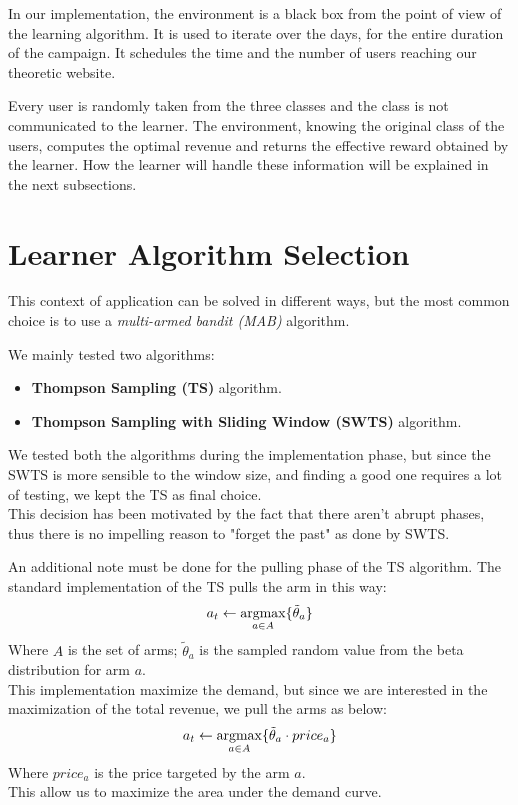 In our implementation, the environment is a black box from the point of view of the learning algorithm.
It is used to iterate over the days, for the entire duration of the campaign.
It schedules the time and the number of users reaching our theoretic website.

Every user is randomly taken from the three classes and the class is not communicated to the learner. The environment, knowing the original class of the users, computes the optimal revenue and returns the effective reward obtained by the learner.
How the learner will handle these information will be explained in the next subsections.

\section{Learner Algorithm Selection}

This context of application can be solved in different ways, but the most common choice is to use a \textit{multi-armed bandit (MAB)} algorithm.

We mainly tested two algorithms:
\begin{itemize}
	\item \textbf{Thompson Sampling (TS)} algorithm.
	\item \textbf{Thompson Sampling with Sliding Window (SWTS)} algorithm.
\end{itemize}

We tested both the algorithms during the implementation phase, but since the SWTS is more sensible to the window size, and finding a good one requires a lot of testing, we kept the TS as final choice.\\
This decision has been motivated by the fact that there aren't abrupt phases, thus there is no impelling reason to "forget the past" as done by SWTS.

An additional note must be done for the pulling phase of the TS algorithm. The standard implementation of the TS pulls the arm in this way:
\begin{equation}
a_t \leftarrow \operatorname*{argmax}_{a \in A} \{\tilde{\theta}_a\}
\end{equation}
Where $A$ is the set of arms; $\tilde{\theta}_a$  is the sampled random value from the beta distribution for arm $a$.\\
This implementation maximize the demand, but since we are interested in the maximization of the total revenue, we pull the arms as below:
\begin{equation}
a_t \leftarrow \operatorname*{argmax}_{a \in A} \{\tilde{\theta}_a \cdot price_a\}
\end{equation}
Where $price_a$ is the price targeted by the arm $a$.\\
This allow us to maximize the area under the demand curve.

